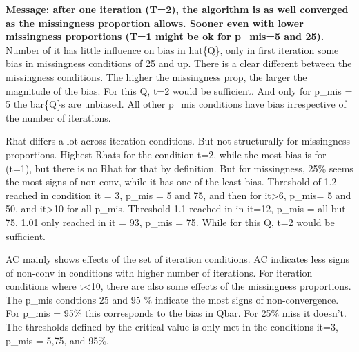 \documentclass[Royal,times,sageh]{sagej}
\begin{document}
\textbf{Message: after one iteration (T=2), the algorithm is as well
converged as the missingness proportion allows. Sooner even with lower
missingness proportions (T=1 might be ok for p\_mis=5 and 25).} Number
of it has little influence on bias in hat\{Q\}, only in first iteration
some bias in missingness conditions of 25 and up. There is a clear
different between the missingness conditions. The higher the missingness
prop, the larger the magnitude of the bias. For this Q, t=2 would be
sufficient. And only for p\_mis = 5 the bar\{Q\}s are unbiased. All
other p\_mis conditions have bias irrespective of the number of
iterations.

Rhat differs a lot across iteration conditions. But not structurally for
missingness proportions. Highest Rhats for the condition t=2, while the
most bias is for (t=1), but there is no Rhat for that by definition. But
for missingness, 25\% seems the most signs of non-conv, while it has one
of the least bias. Threshold of 1.2 reached in condition it = 3, p\_mis
= 5 and 75, and then for it\textgreater6, p\_mis= 5 and 50, and
it\textgreater10 for all p\_mis. Threshold 1.1 reached in in it=12,
p\_mis = all but 75, 1.01 only reached in it = 93, p\_mis = 75. While
for this Q, t=2 would be sufficient.

AC mainly shows effects of the set of iteration conditions. AC indicates
less signs of non-conv in conditions with higher number of iterations.
For iteration conditions where t\textless10, there are also some effects
of the missingness proportions. The p\_mis condtions 25 and 95 \%
indicate the most signs of non-convergence. For p\_mis = 95\% this
corresponds to the bias in Qbar. For 25\% miss it doesn't. The
thresholds defined by the critical value is only met in the conditions
it=3, p\_mis = 5,75, and 95\%.
\end{document}
